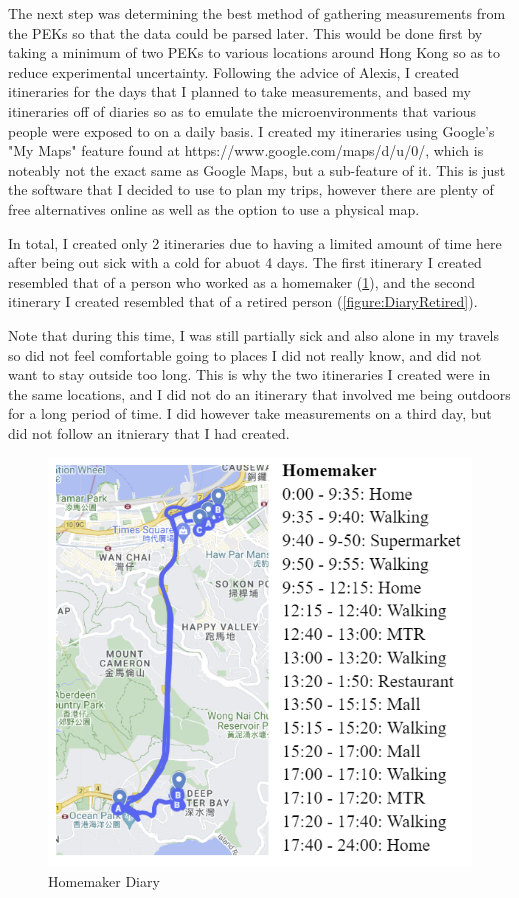 \documentclass{article}
\begin{document}
\begin{multicols}{2}
The next step was determining the best method of gathering 
measurements from the PEKs so that the data could be parsed later. 
This would be done first by taking a minimum of two PEKs to various locations 
around Hong Kong so as to reduce experimental uncertainty. Following the advice of 
Alexis, I created itineraries for the days that I planned to take measurements,
and based my itineraries off of diaries 
so as to emulate the microenvironments that various people were 
exposed to on a daily basis. I created my itineraries using Google's
"My Maps" feature found at https://www.google.com/maps/d/u/0/, which is
noteably not the exact same as Google Maps, but a sub-feature of it. This 
is just the software that I decided to use to plan my trips, however 
there are plenty of free alternatives online as well as the option to use 
a physical map.

In total, I created only 2 itineraries due to having a limited amount of time 
here after being out sick with a cold for abuot 4 days. The first itinerary
I created resembled that of a person who worked as a homemaker 
(\ref{figure:DiaryHomemaker}), and the second 
itinerary I created resembled that of a retired person
(\ref{figure:DiaryRetired}).

Note that during this time, I was still partially sick and also alone in my 
travels so did not feel comfortable going to places I did not really know, and did
not want to stay outside too long. This is why the two itineraries I created 
were in the same locations, and I did not do an itinerary that involved me 
being outdoors for a long period of time. I did however take measurements on a third 
day, but did not follow an itnierary that I had created.

\begin{figure}[H]
  \includegraphics[width=\linewidth]{Diary_Homemaker.png}
  \caption{\label{figure:DiaryHomemaker}Homemaker Diary}
\end{figure}


\end{multicols}
\end{document}
